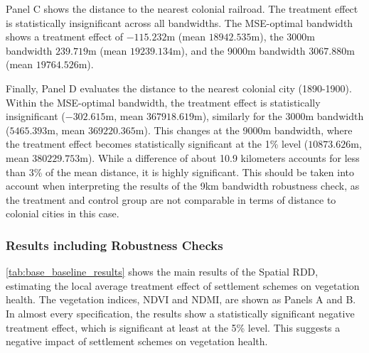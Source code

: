 Panel C shows the distance to the nearest colonial railroad. The treatment effect is statistically insignificant across all bandwidths.
The MSE-optimal bandwidth shows a treatment effect of $-115.232$m (mean $18942.535$m), the 3000m bandwidth $239.719$m (mean $19239.134$m), and the 9000m bandwidth $3067.880$m (mean $19764.526$m).

Finally, Panel D evaluates the distance to the nearest colonial city (1890-1900). Within the MSE-optimal bandwidth, the treatment effect is statistically insignificant ($-302.615$m, mean $367918.619$m), similarly for the 3000m bandwidth ($5465.393$m, mean $369220.365$m).
This changes at the 9000m bandwidth, where the treatment effect becomes statistically significant at the 1\% level ($10873.626$m, mean $380229.753$m).
While a difference of about 10.9 kilometers accounts for less than 3\% of the mean distance, it is highly significant.
This should be taken into account when interpreting the results of the 9km bandwidth robustness check, as the treatment and control group are not comparable in terms of distance to colonial cities in this case.

\subsubsection{Results including Robustness Checks}

\cref{tab:base_baseline_results} shows the main results of the Spatial RDD, estimating the local average treatment effect of settlement schemes on vegetation health.
The vegetation indices, NDVI and NDMI, are shown as Panels A and B.
In almost every specification, the results show a statistically significant negative treatment effect, which is significant at least at the 5\% level.
This suggests a negative impact of settlement schemes on vegetation health.


\begin{customltable}
    \caption{Main Results for Vegetation Impact (NDVI and NDMI)}
    \label{tab:base_baseline_results}
    \setlength{\tabcolsep}{10pt}
    
    
\end{customltable}

